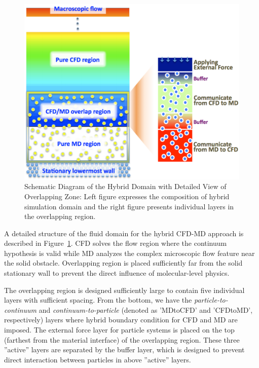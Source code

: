 \documentclass[]{aiaa-tc}%
\begin{document}
\begin{figure}
\includegraphics{Hybrid_Schematic.pdf}
\caption{Schematic Diagram of the Hybrid Domain with Detailed View of Overlapping Zone: 
Left figure expresses the composition of hybrid simulation domain and 
the right figure presents individual layers in the overlapping region.}
\label{Fig:Couette}
\end{figure}


A detailed structure of the fluid domain for the hybrid CFD-MD approach is
described in Figure~\ref{Fig:Couette}. CFD solves the flow region where 
the continuum hypothesis is valid while MD analyzes the complex microscopic 
flow feature near the solid obstacle. Overlapping region is placed sufficiently 
far from the solid stationary wall to prevent the direct influence of 
molecular-level physics.

The overlapping region is designed sufficiently large to contain 
five individual layers with sufficient spacing. From the bottom, 
we have the {\it{particle-to-continuum}} and {\it{continuum-to-particle}} 
(denoted as 'MDtoCFD' and 'CFDtoMD', respectively) layers where hybrid
boundary condition for CFD and MD are imposed. The external force layer
for particle systems is placed on the top (farthest from the
material interface) of the overlapping region. These three ''active'' layers 
are separated by the buffer layer, which is designed to prevent direct 
interaction between particles in above ''active'' layers.
\end{document}
